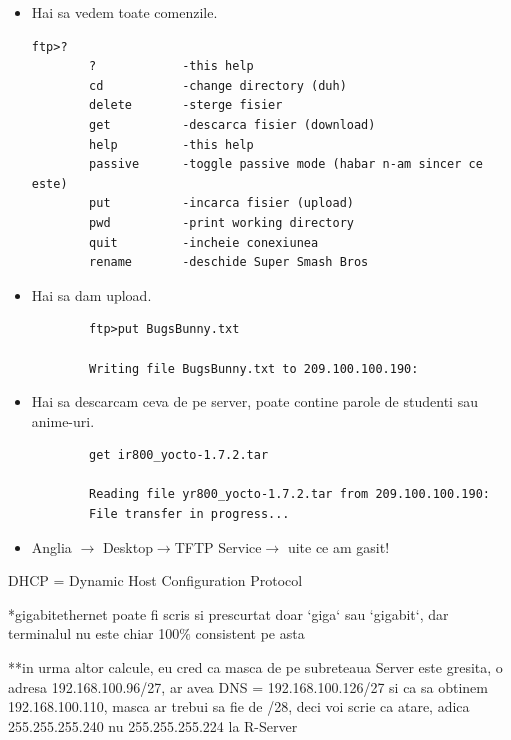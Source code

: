 \documentclass{article}
\begin{document}
\begin{itemize}
\begin{itemize}
    \begin{verbatim}
C:\>ftp 209.100.100.190
Trying to connect...
Connected to 209.100.100.190
220- Welcome to PT Ftp server
Username: Anglia
331- Username ok, need password
Password: 123456
230- Logged in
(passive mode On)
    \end{verbatim}
    \item[6.]Hai sa vedem toate comenzile.
    \begin{verbatim}
ftp>?
        ?            -this help
        cd           -change directory (duh)
        delete       -sterge fisier
        get          -descarca fisier (download)
        help         -this help
        passive      -toggle passive mode (habar n-am sincer ce este)
        put          -incarca fisier (upload)
        pwd          -print working directory
        quit         -incheie conexiunea
        rename       -deschide Super Smash Bros
    \end{verbatim}  
    \item[7.]Hai sa dam upload.

    \begin{verbatim}
        ftp>put BugsBunny.txt 
        
        Writing file BugsBunny.txt to 209.100.100.190:
    \end{verbatim}
    \item[8.]Hai sa descarcam ceva de pe server, poate contine parole de studenti sau anime-uri.
    \begin{verbatim}
        get ir800_yocto-1.7.2.tar 

        Reading file yr800_yocto-1.7.2.tar from 209.100.100.190:
        File transfer in progress...
    \end{verbatim}
    \item[9.] Anglia $\rightarrow$ Desktop$\rightarrow$TFTP Service$\rightarrow$ uite ce am gasit! 
\end{itemize}

    
    
\end{itemize}
DHCP = Dynamic Host Configuration Protocol

*gigabitethernet poate fi scris si prescurtat doar `giga` sau `gigabit`, dar terminalul nu este chiar 100$\%$ consistent pe asta

**in urma altor calcule, eu cred ca masca de pe subreteaua Server este gresita, o adresa 192.168.100.96/27, ar avea DNS = 192.168.100.126/27 si ca sa obtinem 192.168.100.110, masca ar trebui sa fie de /28, deci voi scrie ca atare, adica 255.255.255.240 nu 255.255.255.224 la R-Server
\end{document}

